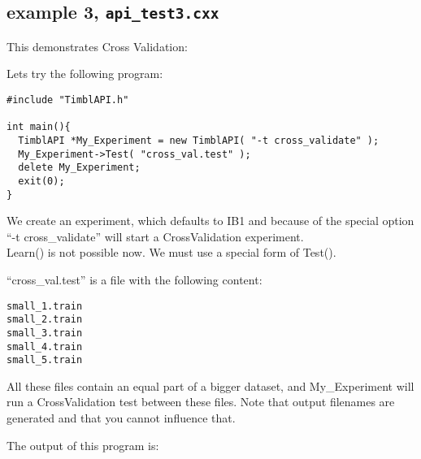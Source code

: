\subsection{example 3, {\tt api\_test3.cxx}}
This demonstrates Cross Validation:

Lets try the following program:

\begin{footnotesize}
\begin{verbatim}
#include "TimblAPI.h"

int main(){
  TimblAPI *My_Experiment = new TimblAPI( "-t cross_validate" );
  My_Experiment->Test( "cross_val.test" );  
  delete My_Experiment;
  exit(0);
}
\end{verbatim}
\end{footnotesize}


We create an experiment, which defaults to IB1 and because of the
special option ``-t cross\_validate'' will start a CrossValidation
experiment.\\
Learn() is not possible now. We must use a special form of Test().

``cross\_val.test'' is a file with the following content:
\begin{footnotesize}
\begin{verbatim}
small_1.train
small_2.train
small_3.train
small_4.train
small_5.train
\end{verbatim}
\end{footnotesize}


All these files contain an equal part of a bigger dataset, and
My\_Experiment will run a CrossValidation test between these files.
Note that output filenames are generated and that you cannot influence
that.

The output of this program is:

